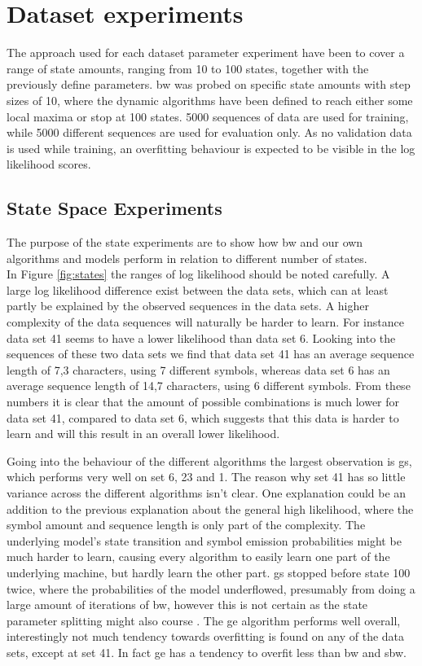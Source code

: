 
\section{Dataset experiments}
The approach used for each dataset parameter experiment have been to cover a range of state amounts, ranging from 10 to 100 states, together with the previously define parameters. \gls{bw} was probed on specific state amounts with step sizes of 10, where the dynamic algorithms have been defined to reach either some local maxima or stop at 100 states. 5000 sequences of data are used for training, while 5000 different sequences are used for evaluation only. As no validation data is used while training, an overfitting behaviour is expected to be visible in the log likelihood scores.

\subsection{State Space Experiments}

The purpose of the state experiments are to show how \gls{bw} and our own algorithms and models perform in relation to different number of states.\\

In Figure \ref{fig:states} the ranges of log likelihood should be noted carefully. A large log likelihood difference exist between the data sets, which can at least partly be explained by the observed sequences in the data sets. A higher complexity of the data sequences will naturally be harder to learn. For instance data set 41 seems to have a lower likelihood than data set 6. Looking into the sequences of these two data sets we find that data set 41 has an average sequence length of 7,3 characters, using 7 different symbols, whereas data set 6 has an average sequence length of 14,7 characters, using 6 different symbols. From these numbers it is clear that the amount of possible combinations is much lower for data set 41, compared to data set 6, which suggests that this data is harder to learn and will this result in an overall lower likelihood. 

Going into the behaviour of the different algorithms the largest observation is \gls{gs}, which performs very well on set 6, 23 and 1. The reason why set 41 has so little variance across the different algorithms isn't clear. One explanation could be an addition to the previous explanation about the general high likelihood, where the symbol amount and sequence length is only part of the complexity. The underlying model's state transition and symbol emission probabilities might be much harder to learn, causing every algorithm to easily learn one part of the underlying machine, but hardly learn the other part. \gls{gs} stopped before state 100 twice, where the probabilities of the model underflowed, presumably from doing a large amount of iterations of \gls{bw}, however this is not certain as the state parameter splitting might also course .
The \gls{ge} algorithm performs well overall, interestingly not much tendency towards overfitting is found on any of the data sets, except at set 41. In fact \gls{ge} has a tendency to overfit less than \gls{bw} and \gls{sbw}.

